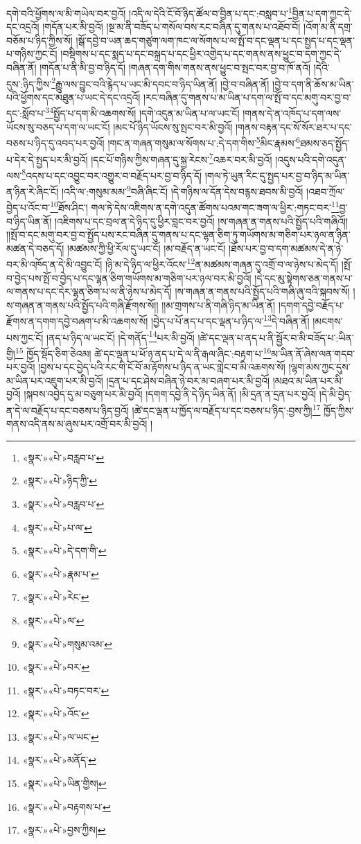 དགེ་བའི་ཕྱོགས་ལ་མི་གཡེལ་བར་བྱའོ། །འདི་ལ་དེའི་ངོ་བོ་ཉིད་ཚོལ་བ་བྱིན་པ་དང་:བསླབ་པ་\footnote{«སྣར་»«པེ་»བརླབ་པ་}བྱིན་པ་དག་ཀྱང་དེ་དང་འདྲའོ། །གདོན་པར་མི་བྱའོ། །སྔ་མ་ནི་བཟོད་པ་གསོལ་བས་རང་བཞིན་དུ་གནས་པ་འཐོབ་བོ། །འོག་མ་ནི་དགྲ་བཅོམ་པ་ཉིད་ཀྱིས་སོ། །སྒོ་དབྱེ་བ་ཡན་ཆད་གཙུག་ལག་ཁང་ལ་སོགས་པ་ལ་སྤོ་བ་དང་ལྡན་པ་དང་སྤྱད་པ་དང་ལྡན་པ་གཉིས་ཀྱང་ངོ། །བསྡིགས་པ་དང་སྨད་པ་དང་བསྐྲད་པ་དང་ཕྱིར་འགྱེད་པ་དང་གནས་ནས་ཕྱུང་བ་དག་ཀྱང་དེ་བཞིན་ནོ། །གདོན་པ་ནི་མི་བྱ་བ་ཉིད་དོ། །གཞན་དག་གིས་གནས་ནས་ཕྱུང་བ་སྤང་བར་བྱ་བ་ཁོ་ནའོ། །དེའི་དུས་:ཉིད་ཀྱིས་\footnote{«སྣར་»«པེ་»ཉིད་ཀྱི་}རྒྱུ་ལས་བྱུང་བའི་རྙེད་པ་ཡང་མི་དབང་བ་ཉིད་ཡིན་ནོ། །བྱེ་བ་བཞིན་ནོ། །བྱེ་བ་དག་ནི་ཆོས་མ་ཡིན་པའི་ཕྱོགས་དང་མཐུན་པ་ཡང་དེ་དང་འདྲའོ། །རང་བཞིན་དུ་གནས་པ་མ་ཡིན་པ་དག་ལ་སྤོ་བ་དང་མགུ་བར་བྱ་བ་དང་:སློབ་པ་\footnote{«སྣར་»«པེ་»བརླབ་པ་}\footnote{«སྣར་»«པེ་»པ་ལ་}སྤྱོད་པ་དག་མི་འཆགས་སོ། །དགེ་འདུན་མ་ཡིན་པ་ལ་ཡང་ངོ། །གནས་དེ་ན་འཁོད་པ་དག་ལས་ཡོངས་སུ་བཅད་པ་དག་ལ་ཡང་ངོ། །མང་པོ་ཉིད་ཡོངས་སུ་སྤང་བར་མི་བྱའོ། །གནས་བརྟན་དང་སོ་སོར་ཐར་པ་དང་བཅས་པ་ཉིད་དུ་འབད་པར་བྱའོ། །གང་ན་གཞན་གསུམ་ལ་སོགས་པ་:དེ་དག་གིས་\footnote{«སྣར་»«པེ་»དེ་དག་གི་}མིང་རྣམས་\footnote{«སྣར་»«པེ་»རྣམ་པ་}ཐམས་ཅད་སྤྱོད་པ་དེར་དེ་སྤྱད་པར་མི་བྱའོ། །དང་པོ་གཉིས་ཀྱིས་གཞན་དུ་སྐྱ་རེངས་\footnote{«སྣར་»«པེ་»རེང་}འཆར་བར་མི་བྱའོ། །འདུས་པའི་དགེ་འདུན་ལས་\footnote{«སྣར་»«པེ་»ལ་}འདས་པ་དང་འབྱུང་བར་འགྱུར་བ་བརྗོད་པར་བྱ་བ་ཉིད་དོ། །གལ་ཏེ་ཡུན་རིང་དུ་སྤྱད་པར་བྱ་བ་ཉིད་མ་ཡིན་ན་ཉིན་རེ་ཞིང་ངོ། །འདི་ལ་:གསུམ་མམ་\footnote{«སྣར་»«པེ་»གསུམ་འམ་}བཞི་ཞིང་ངོ། །དེ་གཉིས་ལ་དོན་དེས་བརྙས་ཐབས་མི་བྱའོ། །འཐབ་ཀྲོལ་བྱེད་པ་འོང་བ་\footnote{«སྣར་»«པེ་»བར་}ཐོས་ཤིང་། གལ་ཏེ་དེས་འཇིགས་ན་དགེ་འདུན་ཚོགས་པའམ་གང་ཟག་ལ་ཕྱིར་:གཏང་བར་\footnote{«སྣར་»«པེ་»བཏང་བར་}བྱ་བ་ཉིད་ཡིན་ནོ། །འཇིགས་པ་དང་བྲལ་ན་དེ་ཉིད་དུ་ཕྱིར་བླང་བར་བྱའོ། །ས་གཞན་ན་གནས་པའི་སྤྱོད་པའི་གཞིའོ།། །།སྤོ་བ་དང་མགུ་བར་བྱ་བ་སྤྱོད་པས་རང་བཞིན་དུ་གནས་པ་དང་ལྷན་ཅིག་ཏུ་གཡོགས་མ་གཅིག་པར་ཉལ་ན་ཉིན་མཚན་དེ་བཅད་དོ། །མཚམས་ཀྱི་ཕྱི་རོལ་དུ་ཡང་ངོ། །མ་བརྗོད་ན་ཡང་ངོ། །ཐོས་པར་བྱ་བ་དག་མཚམས་དེ་ན་ཉེ་བར་མི་འཁོད་ན་དེ་མི་འབྱུང་ངོ། །ཉི་མ་དེ་ཉིད་ལ་ཕྱིར་འོངས་\footnote{«སྣར་»«པེ་»འོང་}ན་མཚམས་གཞན་དུ་འགྲོ་བ་ལ་ཉེས་པ་མེད་དོ། །སྤོ་བ་བྱེད་པས་སྤོ་བ་བྱེད་པ་དང་ལྷན་ཅིག་གཡོགས་མ་གཅིག་པར་ཉལ་བར་མི་བྱའོ། །དེ་དང་མུ་སྟེགས་ཅན་གནས་པ་ལ་གནས་པ་དང་དེར་ལྷན་ཅིག་པ་ལ་ནི་ཉེས་པ་མེད་དོ། །ས་གཞན་ན་གནས་པའི་སྤྱོད་པའི་གཞི་ཞུ་བའི་སྐབས་སོ། །ས་གཞན་ན་གནས་པའི་སྤྱོད་པའི་གཞི་རྫོགས་སོ།། །།མ་གྲགས་པ་ནི་གཞི་ཉིད་མ་ཡིན་ནོ། །དགག་དབྱེ་བརྗོད་པ་རྫོགས་ན་དགག་དབྱེ་བཞག་པ་མི་འཆགས་སོ། །བྱེད་པ་པོ་ནད་པ་དང་ལྡན་པ་ཉིད་ལ་\footnote{«སྣར་»«པེ་»ལ་ཡང་}དེ་བཞིན་ནོ། །མངགས་པས་ཀྱང་ངོ། །ནད་པ་ཉིད་ལ་ཡང་ངོ། །དེ་གནོད་\footnote{«སྣར་»«པེ་»མནོད་}པར་མི་བྱའོ། །ཚེ་དང་ལྡན་པ་ནད་པ་ནི་སྦྱོར་བ་མི་བཟོད་པ་:ཡིན་གྱི།\footnote{«སྣར་»«པེ་»ཡིན་གྱིས།} ཁྱོད་སྡོད་ཅིག་ཅེའམ། ཚེ་དང་ལྡན་པ་ཕོ་ཉ་ནད་པ་དེ་ལ་ནི་རྒལ་ཞིང་:བརྟག་པ་\footnote{«སྣར་»«པེ་»བརྟགས་པ་}མ་ཡིན་ནོ་ཞེས་ལན་གདབ་པར་བྱའོ། །བྱས་པ་དང་བྱེད་པའི་རང་གི་ངོ་བོ་མ་རྟོགས་པ་ཉིད་ན་ཡང་གླེང་བ་མི་འཆགས་སོ། །ལྷག་མས་ཀྱང་དུས་མ་ཡིན་པར་འཇུག་པར་མི་བྱའོ། །དྲན་པ་དང་ཤེས་བཞིན་ཉེ་བར་མ་བཞག་པར་མི་བྱའོ། །མཐའ་མ་ཡིན་པར་མི་བྱའོ། །སྐབས་འབྱེད་དུ་མ་བཅུག་པར་མི་བྱའོ། །དགག་དབྱེ་ནི་དེ་ཉིད་ཡིན་ནོ། །མི་དྲན་ན་དྲན་པར་བྱའོ། །དེ་མི་བྱེད་ན་དེ་ལ་བརྗོད་པ་དང་བཅས་པ་ཉིད་བྱའོ། །ཚེ་དང་ལྡན་པ་ཁྱོད་ལ་བརྗོད་པ་དང་བཅས་པ་ཉིད་:བྱས་ཀྱི།\footnote{«སྣར་»«པེ་»བྱས་ཀྱིས།} ཁྱོད་ཀྱིས་གནས་འདི་ནས་མ་ཞུས་པར་འགྲོ་བར་མི་བྱའོ། །
